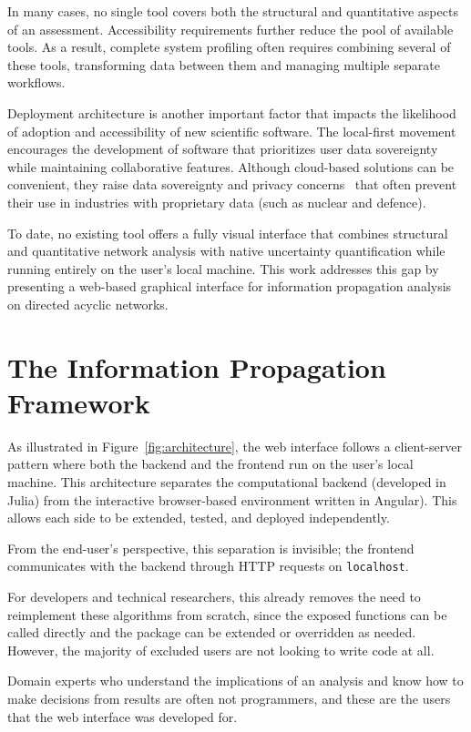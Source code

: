 \documentclass[twocolumn]{rps-esrel2026}
\begin{document}
In many cases, no single tool covers both the structural and quantitative aspects of an assessment. Accessibility requirements further reduce the pool of available tools. As a result, complete system profiling often requires combining several of these tools, transforming data between them and managing multiple separate workflows.

Deployment architecture is another important factor that impacts the likelihood of adoption and accessibility of new scientific software. The local-first movement~\cite{kleppmann2019local} encourages the development of software that prioritizes user data sovereignty while maintaining collaborative features. Although cloud-based solutions can be convenient, they raise data sovereignty and privacy concerns~\cite{hashizume2013analysis} that often prevent their use in industries with proprietary data (such as nuclear and defence).

To date, no existing tool offers a fully visual interface that combines structural and quantitative network analysis with native uncertainty quantification while running entirely on the user's local machine. This work addresses this gap by presenting a web-based graphical interface for information propagation analysis on directed acyclic networks. 


\section{The Information Propagation Framework}
As illustrated in Figure~\ref{fig:architecture}, the web interface follows a client-server pattern where both the backend and the frontend run on the user's local machine. This architecture separates the computational backend (developed in Julia) from the interactive browser-based environment written in Angular). This allows each side to be extended, tested, and deployed independently. 

From the end-user's perspective, this separation is invisible; the frontend communicates with the backend through HTTP requests on \texttt{localhost}.

For developers and technical researchers, this already removes the need to reimplement these algorithms from scratch, since the exposed functions can be called directly and the package can be extended or overridden as needed. However, the majority of excluded users are not looking to write code at all.

Domain experts who understand the implications of an analysis and know how to make decisions from results are often not programmers, and these are the users that the web interface was developed for.
\end{document}
